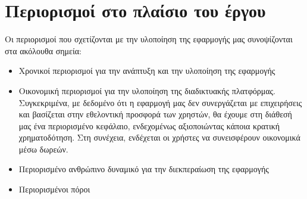 \documentclass[12pt]{article}
\begin{document}
\section{Περιορισμοί στο πλαίσιο του έργου}

Οι περιορισμοί που σχετίζονται με την υλοποίηση της εφαρμογής μας συνοψίζονται στα ακόλουθα σημεία:

\begin{itemize}
	\item Χρονικοί περιορισμοί για την ανάπτυξη και την υλοποίηση της εφαρμογής
	\item Οικονομική περιορισμοί για την υλοποίηση της διαδικτυακής πλατφόρμας. Συγκεκριμένα, με δεδομένο ότι η εφαρμογή μας δεν συνεργάζεται με επιχειρήσεις και βασίζεται στην εθελοντική προσφορά των χρηστών, θα έχουμε στη διάθεσή μας ένα περιορισμένο κεφάλαιο, ενδεχομένως αξιοποιώντας κάποια κρατική χρηματοδότηση. Στη συνέχεια, ενδέχεται οι χρήστες να συνεισφέρουν οικονομικά μέσω δωρεών.
	\item Περιορισμένο ανθρώπινο δυναμικό για την διεκπεραίωση της εφαρμογής
	\item Περιορισμένοι πόροι 


\end{itemize}
\end{document}
